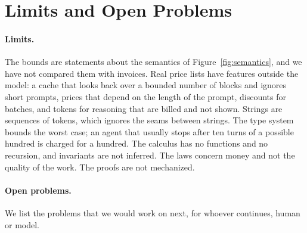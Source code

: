 \documentclass[acmsmall,nonacm,screen]{acmart}
\begin{document}
\section{Limits and Open Problems}
\label{sec:limits}

\paragraph{Limits.} The bounds are statements about the semantics of
Figure~\ref{fig:semantics}, and we have not compared them with invoices. Real price lists
have features outside the model: a cache that looks back over a bounded number of blocks and
ignores short prompts, prices that depend on the length of the prompt, discounts for batches,
and tokens for reasoning that are billed and not shown. Strings are sequences of tokens,
which ignores the seams between strings. The type system bounds the worst case; an agent that
usually stops after ten turns of a possible hundred is charged for a hundred. The calculus
has no functions and no recursion, and invariants are not inferred. The laws concern money
and not the quality of the work. The proofs are not mechanized.

\paragraph{Open problems.} We list the problems that we would work on next, for whoever
continues, human or model.
\end{document}
